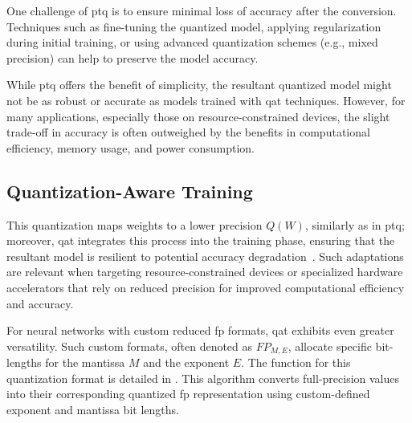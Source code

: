 One challenge of \gls{ptq} is to ensure minimal loss of accuracy after the conversion. Techniques such as fine-tuning the quantized model, applying regularization during initial training, or using advanced quantization schemes (e.g., mixed precision) can help to preserve the model accuracy.

While \gls{ptq} offers the benefit of simplicity, the resultant quantized model might not be as robust or accurate as models trained with \gls{qat} techniques. However, for many applications, especially those on resource-constrained devices, the slight trade-off in accuracy is often outweighed by the benefits in computational efficiency, memory usage, and power consumption.


\subsection{Quantization-Aware Training}

This quantization maps weights to a lower precision \( Q(W) \), similarly as in \gls{ptq}; moreover, \gls{qat} integrates this process into the training phase, ensuring that the resultant model is resilient to potential accuracy degradation~\cite{krishnamoorthi2018quantizing}. Such adaptations are relevant when targeting resource-constrained devices or specialized hardware accelerators that rely on reduced precision for improved computational efficiency and accuracy.

For neural networks with custom reduced \gls{fp} formats, \gls{qat} exhibits even greater versatility. Such custom formats, often denoted as \( FP_{M,E} \), allocate specific bit-lengths for the mantissa \( M \) and the exponent \( E \). The function for this quantization format is detailed in . This algorithm converts full-precision values into their corresponding quantized \gls{fp} representation using custom-defined exponent and mantissa bit lengths.

